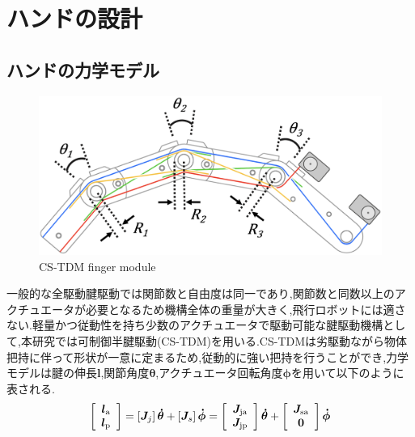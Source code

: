 \documentclass{jarticle}
\begin{document}
\section{ハンドの設計}
\subsection{ハンドの力学モデル}
\vspace{-4mm}
\begin{figure}[h]
  \centering
  \includegraphics[width=0.8\columnwidth]{figs/cs-tdm.eps}
  \caption{CS-TDM finger module}
  \label{fig:cs-tdm}
  \vspace{-2mm}
\end{figure}
一般的な全駆動腱駆動では関節数と自由度は同一であり,関節数と同数以上のアクチュエータが必要となるため機構全体の重量が大きく,飛行ロボットには適さない.軽量かつ従動性を持ち少数のアクチュエータで駆動可能な腱駆動機構として,本研究では可制御半腱駆動(CS-TDM)を用いる.CS-TDMは劣駆動ながら物体把持に伴って形状が一意に定まるため,従動的に強い把持を行うことができ,力学モデルは腱の伸長$\bm{l}$,関節角度$\bm{\theta}$,アクチュエータ回転角度$\bm{\phi}$を用いて以下のように表される\cite{Ozawa}.
\vspace{-2mm}
\begin{equation}
  \left[ \begin{array}{c} \bm{l}_\text{a}\\ \bm{l}_\text{p} \end{array} \right] = \left[ \bm{J}_j \right] \bm{\dot{\theta}} + \left[ \bm{J}_s \right] \bm{\dot{\phi}} = \left[ \begin{array}{c} \bm{J}_\text{ja}\\ \bm{J}_\text{jp} \end{array} \right]  \bm{\dot{\theta}} + \left[ \begin{array}{c} \bm{J}_\text{sa}\\ \bm{0} \end{array} \right] \bm{\dot{\phi}}
  \vspace{-2mm}
  \label{equ:lmatrix}
\end{equation}
\end{document}

